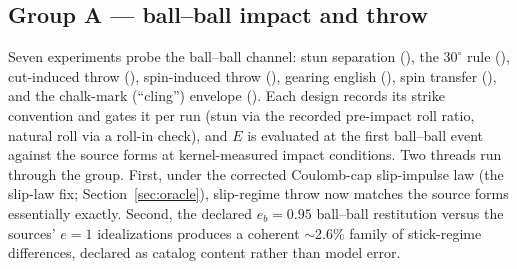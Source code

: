 \subsection{Group A --- ball--ball impact and throw}
\label{sec:results-a}


Seven experiments probe the ball--ball channel: stun separation
(), the $30^\circ$ rule (), cut-induced throw
(), spin-induced throw (), gearing english
(), spin transfer (), and the chalk-mark (``cling'')
envelope (). Each design records its strike convention and
gates it per run (stun via the recorded pre-impact roll ratio, natural
roll via a roll-in check), and $E$ is evaluated at the first ball--ball
event against the source forms \citep{alciatore_tp_catalog} at
kernel-measured impact conditions. Two threads run through the group.
First, under the corrected Coulomb-cap slip-impulse law (the slip-law
fix; Section~\ref{sec:oracle}), slip-regime
throw now matches the source forms essentially exactly. Second, the
declared $e_b = 0.95$ ball--ball restitution versus the sources' $e = 1$
idealizations produces a coherent $\sim$2.6\% family of stick-regime
differences, declared as catalog content rather than model error.

